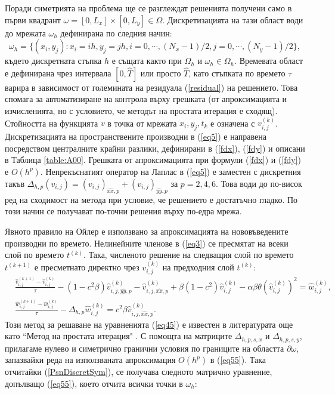\documentclass[a4paper]{article}
\newcommand{\rf}[1]{(\ref{#1})}
\theoremstyle{remark}
\begin{document}
\begin{large}
Поради симетрията на проблема ще се разглеждат решенията получени само в първи квадрант $\omega = [0,L_x] \times[0,L_y] \in \Omega$. Дискретизацията на тази област води до мрежата $\omega_h$ дефинирана по следния начин:
$$
\omega_h = \{(x_i,y_j): x_i = ih, y_j = jh, i = 0,\cdots ,(N_x-1)/2, j = 0,\cdots , (N_y-1)/2 \},
$$
където дискретната стъпка $h$ е същата както при $\Omega_h$ и $\omega_h \in \Omega_h$. Времевата област е дефинирана чрез интервала $[0, \widehat T]$ или просто $\widehat T$, като стъпката по времето $\tau$ варира в зависимост от големината на резидуала \rf{residual} на решението. Това спомага за автоматизиране на контрола върху грешката (от апроксимацията и изчисленията, но с условието, че методът на простата итерация е сходящ). Стойността на функцията $v$ в точка от мрежата $x_i,y_j,t_k$ е означена с $v_{i,j}^{(k)}$. 
Дискретизацията на пространствените производни в \rf{eq5} е направена посредством централните крайни разлики, дефинирани в \rf{fdx}, \rf{fdy} и описани в Таблица \ref{table:A00}. Грешката от апроксимацията при формули \rf{fdx} и \rf{fdy} е $O(h^p)$. Непрекъснатият оператор на Лаплас в \rf{eq5} е заместен с дискретния такъв $\Delta_{h,p} (v_{i,j}) = (v_{i,j})_{\widehat{xx},p} + (v_{i,j})_{\widehat{yy},p}$ за $p=2,4,6$. Това води до по-висок ред на сходимост на метода при условие, че решението е достатъчно гладко. По този начин се получават по-точни решения върху по-едра мрежа. 
\par
Явното правило на Ойлер е използвано за апроксимацията на нововъведените производни по времето. Нелинейните членове в \rf{eq3} се пресмятат на всеки слой по времето $t^{(k)}$. Така, численото решение на следващия слой по времето $t^{(k+1)}$ е пресметнато директно чрез $v_{i,j}^{(k)}$ на предходния слой $t^{(k)}$:
\begin{equation}\label{eq55}
\begin{split}
&\frac {\widehat{v}_{i,j}^{(k+1)}-\widehat{v}_{i,j}^{(k)}}{\tau}- (1-c^2 \beta) \widehat{v}_{i,j,{\widehat{yy},p}}^{(k)} - \widehat{v}_{i,j,{\widehat{xx},p}}^{(k)} + \beta (1-c^2 ) \widehat{v}_{i,j}^{(k)} - \alpha \beta \theta (\widehat{v}_{i,j}^{(k)})^2 = \widehat{w}_{i,j}^{(k)}, \\
&\frac  {\widehat{w}_{i,j}^{(k+1)} -\widehat{w}_{i,j}^{(k)}} {\tau} - \Delta_{h,p} \widehat{w}_{i,j}^{(k)} =  c^2 \beta \widehat{v}_{i,j,{\widehat{xx},p}}^{(k)}.
\end{split}
\end{equation}
Този метод за решаване на уравненията \rf{eq45} е известен в литературата още като ``Метод на простата итерация" \cite{samarski}. С помощта на матриците $\Delta_{h,p,s,x}$ и $\Delta_{h,p,s,y}$, прилагаме нулево и симетрично гранични условия по границите на областта $\partial \omega$, запазвайки реда на използваната апроксимация $O(h^p)$ в \rf{eq55}. Така отчитайки \rf{PsnDiscretSym}, се получава следното матрично уравнение, допълващо \rf{eq55}, което отчита всички точки в $\omega_h$:

\end{large}
\end{document}
